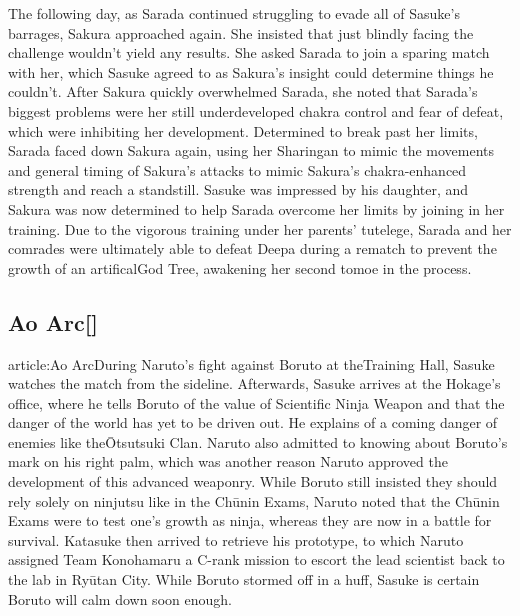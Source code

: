 \documentclass[a4paper,12pt]{article}
\begin{document}
The following day, as Sarada continued struggling to evade all of Sasuke's barrages, Sakura approached again. She insisted that just blindly facing the challenge wouldn't yield any results. She asked Sarada to join a sparing match with her, which Sasuke agreed to as Sakura's insight could determine things he couldn't. After Sakura quickly overwhelmed Sarada, she noted that Sarada's biggest problems were her still underdeveloped chakra control and fear of defeat, which were inhibiting her development. Determined to break past her limits, Sarada faced down Sakura again, using her Sharingan to mimic the movements and general timing of Sakura's attacks to mimic Sakura's chakra-enhanced strength and reach a standstill. Sasuke was impressed by his daughter, and Sakura was now determined to help Sarada overcome her limits by joining in her training. Due to the vigorous training under her parents' tutelege, Sarada and her comrades were ultimately able to defeat Deepa during a rematch to prevent the growth of an artificalGod Tree, awakening her second tomoe in the process.\\ \par \vspace{0.5cm}

\subsection*{Ao Arc[]}\n\nMain article:Ao ArcDuring Naruto's fight against Boruto at theTraining Hall, Sasuke watches the match from the sideline. Afterwards, Sasuke arrives at the Hokage's office, where he tells Boruto of the value of Scientific Ninja Weapon and that the danger of the world has yet to be driven out. He explains of a coming danger of enemies like theŌtsutsuki Clan. Naruto also admitted to knowing about Boruto's mark on his right palm, which was another reason Naruto approved the development of this advanced weaponry. While Boruto still insisted they should rely solely on ninjutsu like in the Chūnin Exams, Naruto noted that the Chūnin Exams were to test one's growth as ninja, whereas they are now in a battle for survival. Katasuke then arrived to retrieve his prototype, to which Naruto assigned Team Konohamaru a C-rank mission to escort the lead scientist back to the lab in Ryūtan City. While Boruto stormed off in a huff, Sasuke is certain Boruto will calm down soon enough.\\ \par \vspace{0.5cm}
\end{document}

